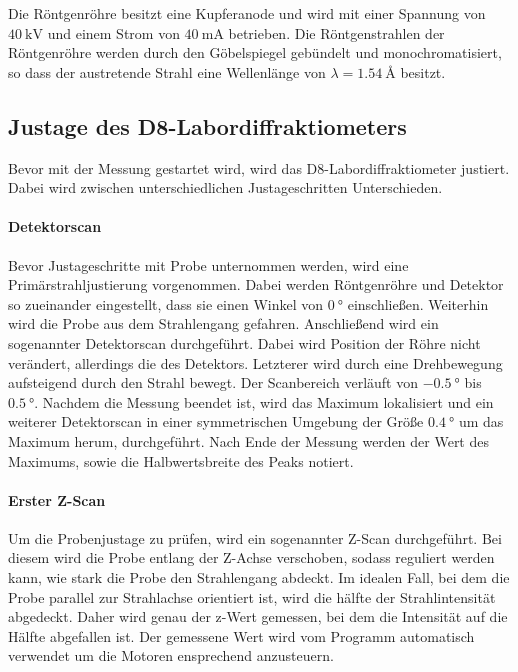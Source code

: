 Die Röntgenröhre besitzt eine Kupferanode und wird mit einer Spannung von $\SI{40}{\kilo\volt}$
und einem Strom von $\SI{40}{\milli\ampere}$ betrieben.
Die Röntgenstrahlen der Röntgenröhre werden durch den Göbelspiegel
gebündelt und monochromatisiert,
so dass der austretende Strahl eine Wellenlänge von
$\lambda=\SI{1.54}{\angstrom}$ besitzt.


\subsection{Justage des D8-Labordiffraktiometers}
\label{subsec:justage}
Bevor mit der Messung gestartet wird, wird das D8-Labordiffraktiometer
justiert. Dabei wird zwischen unterschiedlichen Justageschritten Unterschieden.




\paragraph{Detektorscan}
Bevor Justageschritte mit Probe unternommen werden, wird eine Primärstrahljustierung
vorgenommen. Dabei werden Röntgenröhre und Detektor so zueinander eingestellt,
dass sie einen Winkel von $\SI{0}{\degree}$ einschließen. Weiterhin wird die
Probe aus dem Strahlengang gefahren.
Anschließend wird ein sogenannter Detektorscan durchgeführt.
Dabei wird Position der Röhre nicht verändert, allerdings die des Detektors.
Letzterer wird durch eine Drehbewegung aufsteigend durch den Strahl bewegt. Der Scanbereich
verläuft von $\SI{-0.5}{\degree}$ bis $\SI{0.5}{\degree}$. Nachdem die Messung beendet ist,
wird das Maximum lokalisiert und ein weiterer Detektorscan in einer symmetrischen
Umgebung der Größe $\SI{0.4}{\degree}$ um das Maximum herum, durchgeführt.
Nach Ende der Messung werden der Wert des Maximums, sowie die Halbwertsbreite
des Peaks notiert.

\paragraph{Erster Z-Scan}
Um die Probenjustage zu prüfen,
wird ein sogenannter Z-Scan durchgeführt.
Bei diesem wird die Probe entlang der Z-Achse verschoben,
sodass reguliert werden kann, wie stark die Probe den Strahlengang
abdeckt. Im idealen Fall, bei dem die Probe parallel zur Strahlachse
orientiert ist, wird die hälfte der Strahlintensität abgedeckt.
Daher wird genau der z-Wert gemessen, bei dem die Intensität auf
die Hälfte abgefallen ist. Der gemessene Wert wird vom Programm automatisch
verwendet um die Motoren ensprechend anzusteuern.


